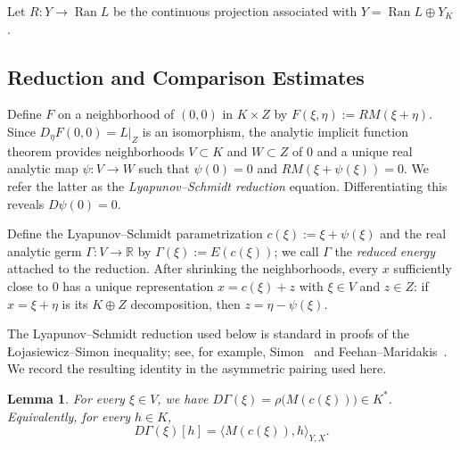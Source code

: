 \documentclass[11pt]{article}
\newtheorem{lemma}[theorem]{Lemma}
\theoremstyle{definition}
\theoremstyle{remark}
\begin{document}
Let $R \colon Y \to \operatorname{Ran} L$ be the continuous projection associated with $Y = \operatorname{Ran} L \oplus Y_K$.


\subsection{Reduction and Comparison Estimates}

Define $F$ on a neighborhood of $(0,0)$ in $K\times Z$ by $F(\xi,\eta):=RM(\xi+\eta)$. Since $D_{\eta}F(0,0)=L|_Z$ is an isomorphism, the analytic implicit function theorem provides neighborhoods $V\subset K$ and $W\subset Z$ of $0$ and a unique real analytic map $\psi:V\to W$ such that $\psi(0)=0$ and $RM(\xi+\psi(\xi))=0$. We refer the latter as the \emph{Lyapunov--Schmidt reduction} equation. Differentiating this reveals $D\psi(0)=0$. 

\smallskip
Define the Lyapunov--Schmidt parametrization $c(\xi):=\xi+\psi(\xi)$ and the real analytic germ $\Gamma:V\to\mathbb R$ by $\Gamma(\xi):=E(c(\xi))$; we call $\Gamma$ the \emph{reduced energy} attached to the reduction. After shrinking the neighborhoods, every $x$ sufficiently close to $0$ has a unique representation $x=c(\xi)+z$ with $\xi\in V$ and $z\in Z$: if $x=\xi+\eta$ is its $K\oplus Z$ decomposition, then $z=\eta-\psi(\xi)$.


The Lyapunov--Schmidt reduction used below is standard in proofs of the \L{}ojasiewicz--Simon inequality; see, for example, Simon~\cite{Simon1983} and Feehan--Maridakis~\cite{FeehanMaridakis2020}. We record the resulting identity in the asymmetric pairing used here.

\begin{lemma} \label{lem:gradient_identity}
For every $\xi \in V$, we have $D\Gamma(\xi) = \rho\bigl(M(c(\xi))\bigr) \in K^*$.
Equivalently, for every $h \in K$, 
$$D\Gamma(\xi)[h] = \langle M(c(\xi)),h\rangle_{Y,X}.$$
\end{lemma}
\end{document}
